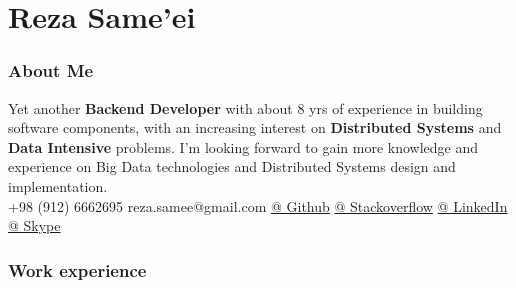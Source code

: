 \documentclass{tccv}
\begin{document}
\part{Reza Same'ei}

\section{About Me}
Yet another \textbf{Backend Developer} with about 8 yrs of experience in building software components, with an increasing interest on \textbf{Distributed Systems} and \textbf{Data Intensive} problems. I’m looking forward to gain more knowledge and experience on Big Data technologies and Distributed Systems design and implementation.\\

  {+98 (912) 6662695}
  {reza.samee@gmail.com}
  {\href{https://github.com/sameei}{@ Github}}
  {\href{https://stackoverflow.com/users/998642/reza-sameei}{@ Stackoverflow}}
  {\href{http://linkedin.com/in/reza-sameei/}{@ LinkedIn}}
  {\href{https://join.skype.com/invite/nINGOAMPxZdX}{@ Skype}}

\section{Work experience}
\end{document}
